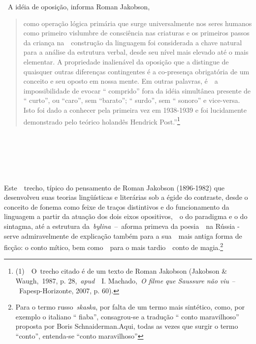 \textbf{~}A idéia de oposição, informa Roman Jakobson,

\begin{quote}
como operação lógica primária que surge universalmente nos seres humanos
como primeiro vislumbre de consciência nas criaturas e os primeiros
passos da criança na~~construção da linguagem foi considerada a chave
natural para a análise da estrutura verbal, desde seu nível mais elevado
até o mais elementar. A propriedade inalienável da oposição que a
distingue de quaisquer outras diferenças contingentes é a co-presença
obrigatória de um conceito e seu oposto em nossa mente. Em outras
palavras, é~~a impossibilidade de evocar `` comprido'' fora da idéia
simultânea presente de `` curto'', ou ``caro'', sem ``barato''; ``
surdo'', sem `` sonoro'' e vice-versa. Isto foi dado a conhecer pela
primeira vez em 1938-1939 e foi lucidamente demonstrado pelo teórico
holandês Hendrick Post.''\footnote{(1)~~O~trecho citado é de um texto de
  Roman Jakobson (Jakobson \& Waugh,~1987, p. 28,~\emph{apud}~~I.
  Machado,~\emph{O filme que Saussure não viu --~}Fapesp-Horizonte,
  2007, p. 60).}
\end{quote}

~

~

~

Este~~trecho, típico do pensamento de Roman Jakobson (1896-1982) que
desenvolveu suas teorias lingüísticas e literárias sob a égide do
contraste, desde o conceito de fonema como feixe de traços distintivos e
do funcionamento da linguagem a partir da atuação dos dois eixos
opositivos,~~o do paradigma e o do sintagma, até a estrutura
da~\emph{bylina}~--~aforma primeva da poesia~~na Rússia - serve
admiravelmente de explicação também para a sua~~mais antiga forma de
ficção: o conto mítico, bem como~~para o mais tardio~~conto de
magia.\footnote{Para o termo russo~\emph{skaska}, por falta de um termo
  mais sintético, como, por exemplo o italiano `` fiaba'', consagrou-se
  a tradução `` conto maravilhoso'' proposta por Boris
  Schnaiderman.Aqui, todas as vezes que surgir o termo ``conto'',
  entenda-se ``conto maravilhoso''}

